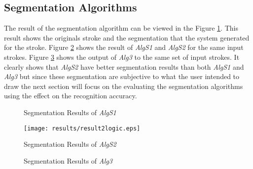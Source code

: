 

\subsection{Segmentation Algorithms}
\label{sec:SegmentationAlgorithms}
The result of the segmentation algorithm can be viewed in the Figure \ref{fig:results1}. This result shows the originals stroke and the segmentation that the system generated for the stroke. Figure \ref{fig:results2} shows the result of \textsl{AlgS1} and \textsl{AlgS2} for the same input strokes.  Figure \ref{fig:results3} shows the output of \textsl{Alg3} to the same set of input strokes. It clearly shows that \textsl{AlgS2} have better segmentation results than both \textsl{AlgS1} and \textsl{Alg3} but since these segmentation are subjective to what the user intended to draw the next section will focus on the evaluating the segmentation algorithms using the effect on the recognition accuracy. 

\begin{figure}

	\centering
	\caption{Segmentation Results of \textsl{AlgS1}}
	\label{fig:results1}

\end{figure}

\begin{figure}
	\centering
			\texttt{[image: results/result2logic.eps]}
	\caption{Segmentation Results of \textsl{AlgS2}}
	\label{fig:results2}
\end{figure}
\begin{figure}
	\centering
		
	\caption{Segmentation Results of \textsl{Alg3} }
	\label{fig:results3}
\end{figure}



